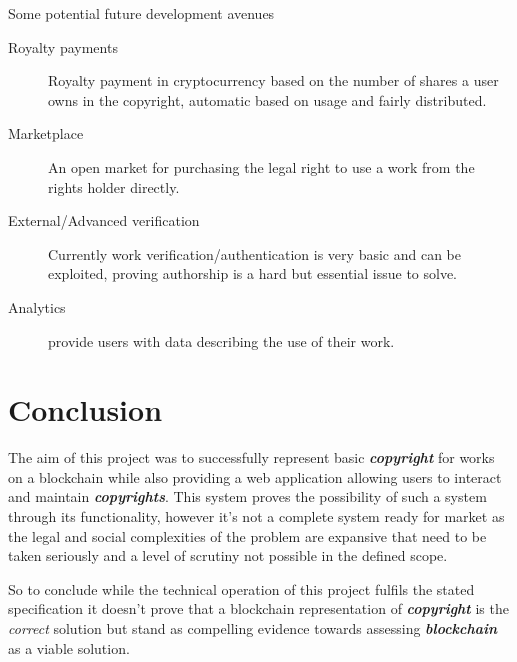 \documentclass[12pt]{article}
\newcommand{\keyword}[1]{\textbf{\textit{#1}}}
\begin{document}
Some potential future development avenues

\begin{description}
	\item[Royalty payments] Royalty payment in cryptocurrency based on the number of shares a user owns in the copyright, automatic based on usage and fairly distributed.
	\item[Marketplace] An open market for purchasing the legal right to use a work from the rights holder directly.
	\item[External/Advanced verification] Currently work verification/authentication is very basic and can be exploited, proving authorship is a hard but essential issue to solve.
	\item[Analytics] provide users with data describing the use of their work.
\end{description}

\section{Conclusion}

The aim of this project was to successfully represent basic \keyword{copyright} for works on a blockchain while also providing a web application allowing users to interact and maintain \keyword{copyrights}. This system proves the possibility of such a system through its functionality, however it's not a complete system ready for market as the legal and social complexities of the problem are expansive that need to be taken seriously and a level of scrutiny not possible in the defined scope.

So to conclude while the technical operation of this project fulfils the stated specification it doesn't prove that a blockchain representation of \keyword{copyright} is the \textit{correct} solution but stand as compelling evidence towards assessing \keyword{blockchain} as a viable solution.





\end{document}
